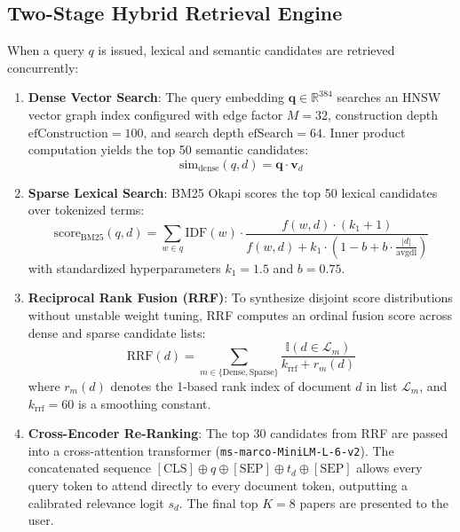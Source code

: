 \documentclass[journal]{IEEEtran}
\begin{document}
\subsection{Two-Stage Hybrid Retrieval Engine}
When a query $q$ is issued, lexical and semantic candidates are retrieved concurrently:
\begin{enumerate}
    \item \textbf{Dense Vector Search}: The query embedding $\mathbf{q} \in \mathbb{R}^{384}$ searches an HNSW vector graph index configured with edge factor $M = 32$, construction depth $\text{efConstruction} = 100$, and search depth $\text{efSearch} = 64$. Inner product computation yields the top 50 semantic candidates:
    \begin{equation}
        \text{sim}_{\text{dense}}(q, d) = \mathbf{q} \cdot \mathbf{v}_d
    \end{equation}
    \item \textbf{Sparse Lexical Search}: BM25 Okapi scores the top 50 lexical candidates over tokenized terms:
    \begin{equation}
        \text{score}_{\text{BM25}}(q, d) = \sum_{w \in q} \text{IDF}(w) \cdot \frac{f(w, d) \cdot (k_1 + 1)}{f(w, d) + k_1 \cdot \left(1 - b + b \cdot \frac{|d|}{\text{avgdl}}\right)}
    \end{equation}
    with standardized hyperparameters $k_1 = 1.5$ and $b = 0.75$.
    \item \textbf{Reciprocal Rank Fusion (RRF)}: To synthesize disjoint score distributions without unstable weight tuning, RRF computes an ordinal fusion score across dense and sparse candidate lists:
    \begin{equation}
        \text{RRF}(d) = \sum_{m \in \{\text{Dense}, \text{Sparse}\}} \frac{\mathbb{I}(d \in \mathcal{L}_m)}{k_{\text{rrf}} + r_m(d)}
    \end{equation}
    where $r_m(d)$ denotes the 1-based rank index of document $d$ in list $\mathcal{L}_m$, and $k_{\text{rrf}} = 60$ is a smoothing constant.
    \item \textbf{Cross-Encoder Re-Ranking}: The top 30 candidates from RRF are passed into a cross-attention transformer (\texttt{ms-marco-MiniLM-L-6-v2}). The concatenated sequence $[\text{CLS}] \oplus q \oplus [\text{SEP}] \oplus t_d \oplus [\text{SEP}]$ allows every query token to attend directly to every document token, outputting a calibrated relevance logit $s_d$. The final top $K = 8$ papers are presented to the user.
\end{enumerate}
\end{document}
